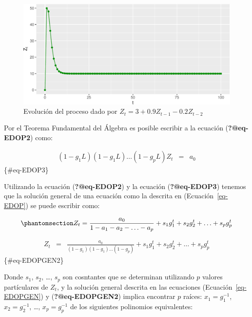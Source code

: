 \documentclass[
  a4paper,
]{article}
\begin{document}
\begin{figure}[H]

\caption{Evolución del proceso dado por
\(Z_t =3+0.9Z_{t-1}-0.2Z_{t-2}\)}

{\centering \includegraphics{index_files/figure-pdf/fig23-1.pdf}

}

\end{figure}%

Por el Teorema Fundamental del Álgebra es posible escribir a la ecuación
(\textbf{?@eq-EDOP2}) como:

\begin{eqnarray}
    (1 - g_1 L)(1 - g_1 L) \ldots (1 - g_p L) Z_t & = & a_0
\end{eqnarray} \{\#eq-EDOP3\}

Utilizando la ecuación (\textbf{?@eq-EDOP2}) y la ecuación
(\textbf{?@eq-EDOP3}) tenemos que la solución general de una ecuación
como la descrita en (Ecuación~\ref{eq-EDOP}) se puede escribir como:

\begin{equation}\phantomsection\label{eq-EDOPGEN}{
    Z_t  =  \frac{a_0}{1 - a_1 - a_2 - \ldots - a_p} + s_1 g^t_1 + s_2 g^t_2 + \ldots + s_p g^t_p \\
}\end{equation}

\begin{eqnarray}
    Z_t & = & \frac{a_0}{(1 - g_1)(1 - g_1) \ldots (1 - g_p)} + s_1 g^t_1 + s_2 g^t_2 + \ldots + s_p g^t_p 
\end{eqnarray} \{\#eq-EDOPGEN2\}

Donde \(s_1\), \(s_2\), \ldots, \(s_p\) son cosntantes que se determinan
utilizando \(p\) valores partículares de \(Z_t\), y la solución general
descrita en las ecuaciones (Ecuación~\ref{eq-EDOPGEN}) y
(\textbf{?@eq-EDOPGEN2}) implica encontrar \(p\) raíces:
\(x_1 = g^{-1}_1\), \(x_2 = g^{-1}_2\), \ldots, \(x_p = g^{-1}_p\) de
los siguientes polinomios equivalentes:
\end{document}
